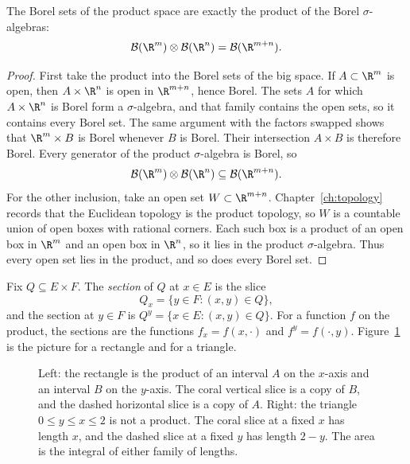 \begin{proposition}\label{prop:borelproduct}
The Borel sets of the product space are exactly the product of the Borel $\sigma$-algebras:
\[
\mathcal B(\R^m)\otimes\mathcal B(\R^n)=\mathcal B(\R^{m+n}).
\]
\end{proposition}
\begin{proof}
First take the product into the Borel sets of the big space. If $A\subset\R^m$ is open, then $A\times\R^n$ is open in $\R^{m+n}$, hence Borel. The sets $A$ for which $A\times\R^n$ is Borel form a $\sigma$-algebra, and that family contains the open sets, so it contains every Borel set. The same argument with the factors swapped shows that $\R^m\times B$ is Borel whenever $B$ is Borel. Their intersection $A\times B$ is therefore Borel. Every generator of the product $\sigma$-algebra is Borel, so
\[
\mathcal B(\R^m)\otimes\mathcal B(\R^n)\subseteq\mathcal B(\R^{m+n}).
\]
For the other inclusion, take an open set $W\subset\R^{m+n}$. Chapter~\ref{ch:topology} records that the Euclidean topology is the product topology, so $W$ is a countable union of open boxes with rational corners. Each such box is a product of an open box in $\R^m$ and an open box in $\R^n$, so it lies in the product $\sigma$-algebra. Thus every open set lies in the product, and so does every Borel set.
\end{proof}

Fix $Q\subseteq E\times F$. The \emph{section} of $Q$ at $x\in E$ is the slice
\[
Q_x=\{y\in F:(x,y)\in Q\},
\]
and the section at $y\in F$ is $Q^y=\{x\in E:(x,y)\in Q\}$. For a function $f$ on the product, the sections are the functions $f_x=f(x,\cdot)$ and $f^y=f(\cdot,y)$. Figure~\ref{fig:rw-slices} is the picture for a rectangle and for a triangle.

\begin{figure}[ht]
\centering
{}
\caption{Left: the rectangle is the product of an interval $A$ on the $x$-axis and an interval $B$ on the $y$-axis. The coral vertical slice is a copy of $B$, and the dashed horizontal slice is a copy of $A$. Right: the triangle $0\le y\le x\le 2$ is not a product. The coral slice at a fixed $x$ has length $x$, and the dashed slice at a fixed $y$ has length $2-y$. The area is the integral of either family of lengths.}
\label{fig:rw-slices}
\end{figure}

